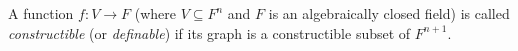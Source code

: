 A function $f : V \to F$ (where $V \subseteq F^n$ and $F$ is an algebraically closed field) is called \emph{constructible} (or \emph{definable}) if its graph is a constructible subset of $F^{n+1}$.
